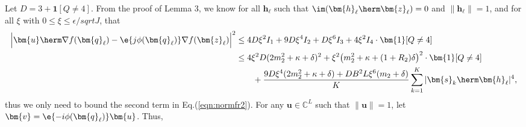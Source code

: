 			Let $D=3+\bm{1}[Q\neq4]$. From the proof of Lemma 3, we know for all $\bm{h}_{\ell}$ such that $\im(\bm{h}_{\ell}\herm\bm{z}_{\ell})=0$ and $\|\bm{h}_{\ell}\|=1$, and for all $\xi$ with $0\leq \xi\leq \epsilon/sqrt{J}$, that
			\begin{align}
				\Big|\bm{u}\herm\nabla f(\bm{q}_{\ell}) - \e{j\phi(\bm{q}_{\ell})}\nabla f(\bm{z}_{\ell})\Big|^2 
				&\leq 4D\xi^2I_1+9D\xi^4I_2+D\xi^6I_3 + 4\xi^2I_4\cdot\bm{1}[Q\neq 4]\nonumber\\
				&\leq4\xi^2D(2 m_2^2+\kappa+\delta)^2+ \xi^2\big(m_2^2+\kappa+(1+R_2)\delta\big)^2\cdot\bm{1}[Q\neq 4] \nonumber\\
				&\qquad+ \frac{9D\xi^4(2 m_2^2+\kappa+\delta)+DB^2L\xi^6(  m_2+\delta)}{K}\sum_{k=1}^K|\bm{s}_k\herm\bm{h}_{\ell}|^4,\label{eqn:bound_cma_beta}
			\end{align}
			thus we only need to bound the second term in Eq.(\ref{eqn:normfr2}). For any $\bm{u}\in\mathbb{C}^L$ such that $\|\bm{u}\|=1$, let $\bm{v}=\e{-i\phi(\bm{q}_{\ell})}\bm{u}$. Thus,
